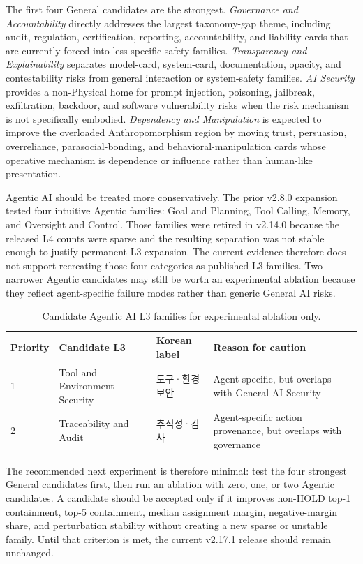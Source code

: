 \documentclass[11pt,a4paper]{article}
\begin{document}
The first four General candidates are the strongest. \emph{Governance and
Accountability} directly addresses the largest taxonomy-gap theme, including
audit, regulation, certification, reporting, accountability, and liability
cards that are currently forced into less specific safety families.
\emph{Transparency and Explainability} separates model-card, system-card,
documentation, opacity, and contestability risks from general interaction or
system-safety families. \emph{AI Security} provides a non-Physical home for
prompt injection, poisoning, jailbreak, exfiltration, backdoor, and software
vulnerability risks when the risk mechanism is not specifically embodied.
\emph{Dependency and Manipulation} is expected to improve the overloaded
Anthropomorphism region by moving trust, persuasion, overreliance,
parasocial-bonding, and behavioral-manipulation cards whose operative
mechanism is dependence or influence rather than human-like presentation.

Agentic AI should be treated more conservatively. The prior v2.8.0 expansion
tested four intuitive Agentic families: Goal and Planning, Tool Calling,
Memory, and Oversight and Control. Those families were retired in v2.14.0
because the released L4 counts were sparse and the resulting separation was
not stable enough to justify permanent L3 expansion. The current evidence
therefore does not support recreating those four categories as published L3
families. Two narrower Agentic candidates may still be worth an experimental
ablation because they reflect agent-specific failure modes rather than generic
General AI risks.

\begin{table}[ht]
\centering
\caption{Candidate Agentic AI L3 families for experimental ablation only.}
\label{tab:agentic-candidate-l3}
\begin{tabular}{llll}
\toprule
Priority & Candidate L3 & Korean label & Reason for caution \\
\midrule
1 & Tool and Environment Security & 도구·환경 보안 & Agent-specific, but overlaps with General AI Security \\
2 & Traceability and Audit & 추적성·감사 & Agent-specific action provenance, but overlaps with governance \\
\bottomrule
\end{tabular}
\end{table}

The recommended next experiment is therefore minimal: test the four strongest
General candidates first, then run an ablation with zero, one, or two Agentic
candidates. A candidate should be accepted only if it improves non-HOLD top-1
containment, top-5 containment, median assignment margin, negative-margin
share, and perturbation stability without creating a new sparse or unstable
family. Until that criterion is met, the current v2.17.1 release should remain
unchanged.
\end{document}
